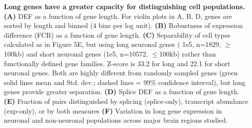 \textbf{Long genes have a greater capacity for distinguishing cell populations. (A)} DEF as a function of gene length. For violin plots in A, B, D, genes are sorted by length and binned (4 bins per log unit). \textbf{(B)} Robustness of expression difference (FCR) as a function of gene length. \textbf{(C)} Separability of cell types calculated as in Figure 5E, but using long neuronal genes (\> 1e5, n=1829, $\geq$100kb) and short neuronal genes (\<1e5, n=10572, $\leq$100kb) rather than functionally defined gene families. Z-score is 33.2 for long and 22.1 for short neuronal genes. Both are highly different from randomly sampled genes (green solid lines mean and Std. dev.; dashed lines = 99\% confidence interval), but long genes provide greater separation. \textbf{(D)} Splice DEF as a function of gene length. \textbf{(E)} Fraction of pairs distinguished by splicing (splice-only), transcript abundance (exp-only), or by both measures \textbf{(F)} Variation in long gene expression in neuronal and non-neuronal populations across major brain regions studied.  